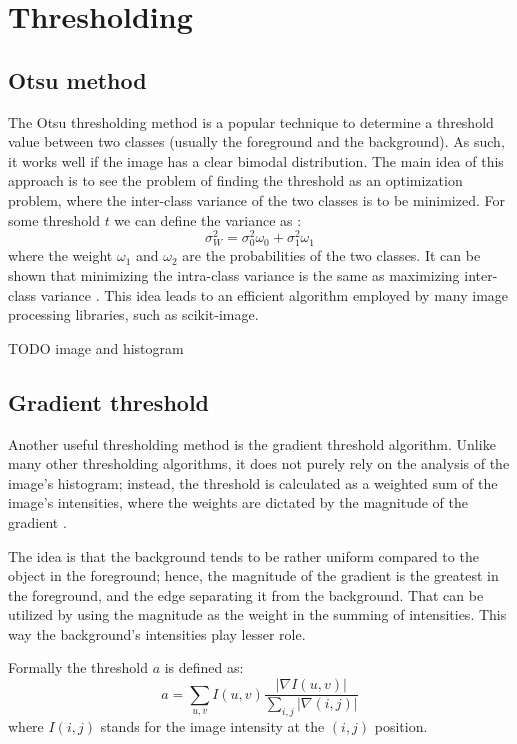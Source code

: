 \documentclass[
  digital,     %
  oneside,     %
  nosansbold,  %
  nocolorbold, %
  lof,         %
  lot,         %
]{fithesis4}
\begin{document}
\section{Thresholding}

\subsection{Otsu method}

The Otsu thresholding method is a popular technique to determine a threshold
value between two classes (usually the foreground and the background). As such,
it works well if the image has a clear bimodal distribution. The main idea of
this approach is to see the problem of finding the threshold as an optimization
problem, where the inter-class variance of the two classes is to be minimized.
For some threshold $t$ we can define the variance as \parencite{otsu1979}:
$$\sigma^2_W = \sigma^2_0 \omega_0 + \sigma^2_1 \omega_1$$  %
where the weight $\omega_1$ and $\omega_2$ are the probabilities of the two
classes. It can be shown that minimizing the intra-class variance is the same as
maximizing inter-class variance \parencite{otsu1979}. This idea leads to an
efficient algorithm employed by many image processing libraries, such as
scikit-image.

TODO image and histogram

\subsection{Gradient threshold}

Another useful thresholding method is the gradient threshold algorithm. Unlike
many other thresholding algorithms, it does not purely rely on the analysis of
the image's histogram; instead, the threshold is calculated as a weighted sum of
the image's intensities, where the weights are dictated by the magnitude of the
gradient \cite{pb130}.

The idea is that the background tends to be rather uniform compared to the
object in the foreground; hence, the magnitude of the gradient is the greatest
in the foreground, and the edge separating it from the background. That can be
utilized by using the magnitude as the weight in the summing of intensities.
This way the background's intensities play lesser role.

Formally the threshold $a$ is defined as:
$$a = \sum_{u, v} I(u, v) \frac{|\nabla I(u, v)|}{\sum_{i, j} |\nabla(i,j)|}$$
where $I(i, j)$ stands for the image intensity at the $(i, j)$ position.
\end{document}
